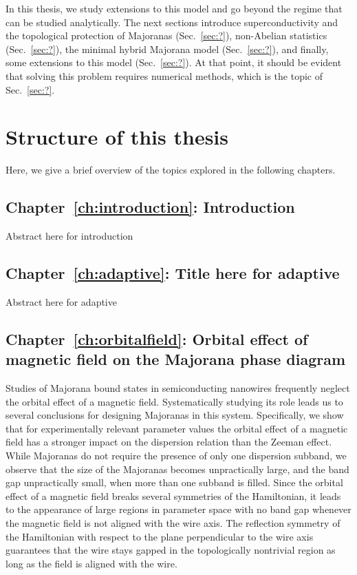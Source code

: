 In this thesis, we study extensions to this model and go beyond the regime that can be studied analytically.
The next sections introduce superconductivity and the topological protection of Majoranas (Sec.~\ref{sec:?}), non-Abelian statistics (Sec.~\ref{sec:?}), the minimal hybrid Majorana model (Sec.~\ref{sec:?}), and finally, some extensions to this model (Sec.~\ref{sec:?}).
At that point, it should be evident that solving this problem requires numerical methods, which is the topic of Sec.~\ref{sec:?}.

\section{Structure of this thesis}

Here, we give a brief overview of the topics explored in the following chapters.
\vspace{1mm}

\subsection{Chapter~\ref{ch:introduction}: Introduction}
Abstract here for introduction
\vspace{1mm}

\subsection{Chapter~\ref{ch:adaptive}: Title here for adaptive}
Abstract here for adaptive
\vspace{1mm}

\subsection{Chapter~\ref{ch:orbitalfield}: Orbital effect of magnetic field on the Majorana phase diagram}
Studies of Majorana bound states in semiconducting nanowires frequently neglect the orbital effect of a magnetic field.
Systematically studying its role leads us to several conclusions for designing Majoranas in this system.
Specifically, we show that for experimentally relevant parameter values the orbital effect of a magnetic field has a stronger impact on the dispersion relation than the Zeeman effect.
While Majoranas do not require the presence of only one dispersion subband, we observe that the size of the Majoranas becomes unpractically large, and the band gap unpractically small, when more than one subband is filled.
Since the orbital effect of a magnetic field breaks several symmetries of the Hamiltonian, it leads to the appearance of large regions in parameter space with no band gap whenever the magnetic field is not aligned with the wire axis.
The reflection symmetry of the Hamiltonian with respect to the plane perpendicular to the wire axis guarantees that the wire stays gapped in the topologically nontrivial region as long as the field is aligned with the wire.
\vspace{1mm}

